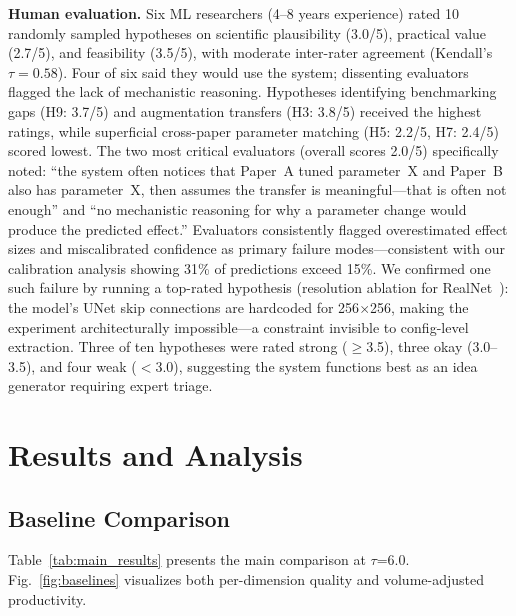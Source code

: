 \documentclass[conference]{IEEEtran}
\begin{document}
\textbf{Human evaluation.}
Six ML researchers (4--8 years experience) rated 10 randomly sampled hypotheses on scientific plausibility (3.0/5), practical value (2.7/5), and feasibility (3.5/5), with moderate inter-rater agreement (Kendall's $\tau = 0.58$).
Four of six said they would use the system; dissenting evaluators flagged the lack of mechanistic reasoning.
Hypotheses identifying benchmarking gaps (H9: 3.7/5) and augmentation transfers (H3: 3.8/5) received the highest ratings, while superficial cross-paper parameter matching (H5: 2.2/5, H7: 2.4/5) scored lowest.
The two most critical evaluators (overall scores 2.0/5) specifically noted: ``the system often notices that Paper~A tuned parameter~X and Paper~B also has parameter~X, then assumes the transfer is meaningful---that is often not enough'' and ``no mechanistic reasoning for why a parameter change would produce the predicted effect.''
Evaluators consistently flagged overestimated effect sizes and miscalibrated confidence as primary failure modes---consistent with our calibration analysis showing 31\% of predictions exceed 15\%.
We confirmed one such failure by running a top-rated hypothesis (resolution ablation for RealNet~\cite{zhang2024realnet}): the model's UNet skip connections are hardcoded for 256$\times$256, making the experiment architecturally impossible---a constraint invisible to config-level extraction.
Three of ten hypotheses were rated strong ($\geq$3.5), three okay (3.0--3.5), and four weak ($<$3.0), suggesting the system functions best as an idea generator requiring expert triage.


\section{Results and Analysis}\label{sec:results}

\subsection{Baseline Comparison}

Table~\ref{tab:main_results} presents the main comparison at $\tau$=6.0.
Fig.~\ref{fig:baselines} visualizes both per-dimension quality and volume-adjusted productivity.
\end{document}

